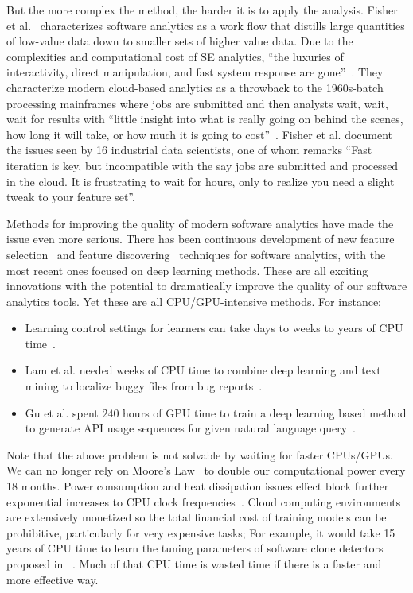\documentclass[sigconf,review, anonymous]{acmart}
\theoremstyle{break}
\newcommand{\bi}{\begin{itemize}[leftmargin=0.4cm]}
\newcommand{\ei}{\end{itemize}}
\begin{document}
But the more complex the  method,
the harder it is to apply the analysis.
Fisher et al.~\cite{fisher2012interactions} characterizes software analytics as a work flow that distills large quantities of low-value data down to smaller sets of higher value data. Due to the complexities and computational cost of SE analytics, ``the luxuries of interactivity, direct manipulation, and fast system response are gone''~\cite{fisher2012interactions}. They characterize modern cloud-based analytics as a throwback to the 1960s-batch processing mainframes where jobs are submitted and then analysts wait, wait, wait for results with ``little insight into what is really going on behind the scenes, how long it will take, or how much it is going to cost''~\cite{fisher2012interactions}. Fisher et al. document the issues seen by 16 industrial data scientists, one of whom remarks ``Fast iteration is key, but incompatible with the say jobs are submitted and processed in the cloud. It is frustrating to wait for hours, only to realize you need a slight tweak to your feature set''.

Methods for improving the quality of modern software analytics have made the issue even more serious. There has been continuous development of new feature selection~\cite{hall2003benchmarking} and feature discovering~\cite{jiang2013personalized} techniques for software analytics, with the most recent ones focused on deep learning methods. These are all exciting innovations with the potential to dramatically improve the quality of our software analytics tools. Yet these are all CPU/GPU-intensive methods. For instance:
\bi
\item Learning control settings for learners can take days to weeks to years of CPU time~\cite{fu2016differential,tantithamthavorn2016automated,wang2013searching}.
\item Lam et al. needed weeks of CPU time to combine deep learning and text mining to localize buggy
files from bug reports~\cite{lam2015combining}.
\item Gu et al. spent $240$ hours of GPU time  to train a deep learning based method to generate API usage sequences for given natural language query~\cite{gu2016deep}. 
\ei 
Note that the above problem is not solvable by waiting for faster CPUs/GPUs. We 
can no longer rely on Moore's Law ~\cite{moore1998cramming}to double our computational power every 18 months. Power consumption and heat dissipation issues effect block further exponential increases to CPU clock frequencies~\cite{kumar2003single}. Cloud computing environments are extensively monetized so the total financial cost of training models can be prohibitive, particularly for very expensive tasks; For example, it would take 15 years of CPU time to learn the tuning parameters of software clone detectors proposed in ~\cite{wang2013searching}. Much of that CPU time is wasted time if there is a faster and more effective way.
\end{document}
